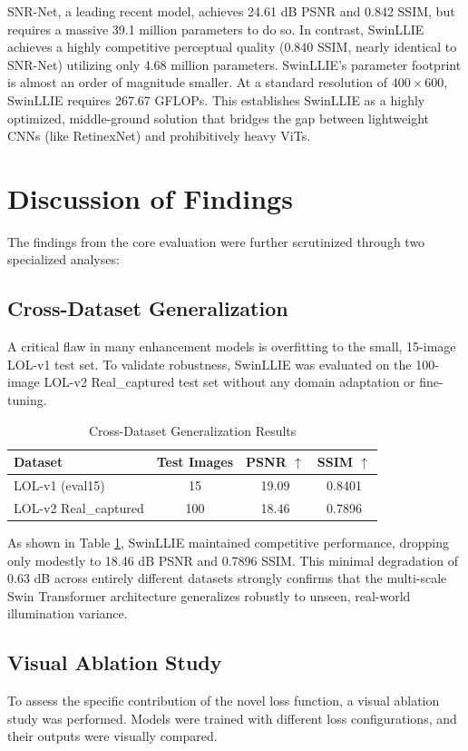 \documentclass[12pt, a4paper]{report}
\begin{document}
SNR-Net, a leading recent model, achieves 24.61 dB PSNR and 0.842 SSIM, but requires a massive 39.1 million parameters to do so. In contrast, SwinLLIE achieves a highly competitive perceptual quality (0.840 SSIM, nearly identical to SNR-Net) utilizing only 4.68 million parameters. SwinLLIE's parameter footprint is almost an order of magnitude smaller. At a standard resolution of $400 \times 600$, SwinLLIE requires 267.67 GFLOPs. This establishes SwinLLIE as a highly optimized, middle-ground solution that bridges the gap between lightweight CNNs (like RetinexNet) and prohibitively heavy ViTs.

\section{Discussion of Findings}
The findings from the core evaluation were further scrutinized through two specialized analyses:

\subsection{Cross-Dataset Generalization}
A critical flaw in many enhancement models is overfitting to the small, 15-image LOL-v1 test set. To validate robustness, SwinLLIE was evaluated on the 100-image LOL-v2 Real\_captured test set without any domain adaptation or fine-tuning.

\begin{table}[htbp]
\caption{Cross-Dataset Generalization Results}
\centering
\begin{tabular}{lccc}
\toprule
\textbf{Dataset} & \textbf{Test Images} & \textbf{PSNR $\uparrow$} & \textbf{SSIM $\uparrow$} \\
\midrule
LOL-v1 (eval15) & 15 & 19.09 & 0.8401 \\
LOL-v2 Real\_captured & 100 & 18.46 & 0.7896 \\
\bottomrule
\end{tabular}
\label{tab:generalization}
\end{table}

As shown in Table \ref{tab:generalization}, SwinLLIE maintained competitive performance, dropping only modestly to 18.46 dB PSNR and 0.7896 SSIM. This minimal degradation of 0.63 dB across entirely different datasets strongly confirms that the multi-scale Swin Transformer architecture generalizes robustly to unseen, real-world illumination variance.

\subsection{Visual Ablation Study}
To assess the specific contribution of the novel loss function, a visual ablation study was performed. Models were trained with different loss configurations, and their outputs were visually compared.
\end{document}
